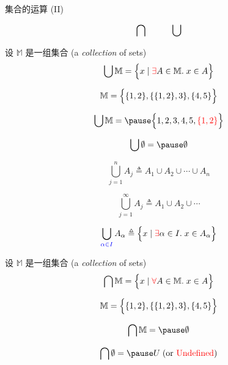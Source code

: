 
\begin{frame}{}
  \begin{center}
    {\Large 集合的运算 (II)}
  \end{center}

  \[
    \text{\Large $\bigcap \qquad \bigcup$}
  \]
\end{frame}

\begin{frame}{}
  \begin{definition}
    设 $\mathbb{M}$ 是一组集合 (a {\it collection} of sets)
    \[
      \bigcup \mathbb{M} = \Big\{x \mid \textcolor{red}{\exists} A \in \mathbb{M}.\; x \in A\Big\}
    \]
  \end{definition}

  \pause
  \[
    \mathbb{M} = \Big\{\{1, 2\}, \{\{1, 2\}, 3\}, \{4, 5\}\Big\}
  \]

  \pause
  \[
    \bigcup \mathbb{M} = \pause\Bset{1, 2, 3, 4, 5, \red{\set{1, 2}}}
  \]

  \pause
  \[
    \bigcup \emptyset = \pause \emptyset
  \]
\end{frame}

\begin{frame}{}
  \[
    \bigcup_{j = 1}^{n} A_j \triangleq A_1 \cup A_2 \cup \cdots \cup A_n
  \]

  \pause
  \vspace{0.50cm}
  \[
    \bigcup_{j = 1}^{\infty} A_j \triangleq A_1 \cup A_2 \cup \cdots
  \]

  \pause
  \vspace{0.50cm}
  \[
    \bigcup_{\textcolor{blue}{\alpha \in I}} A_{\alpha} \triangleq
      \Big\{x \mid \textcolor{red}{\exists} \alpha \in I.\; x \in A_{\alpha}\Big\}
  \]
\end{frame}

\begin{frame}{}
  \begin{definition}
    设 $\mathbb{M}$ 是一组集合 (a {\it collection} of sets)
    \[
      \bigcap \mathbb{M} = \Big\{x \mid \textcolor{red}{\forall} A \in \mathbb{M}.\; x \in A\Big\}
    \]
  \end{definition}

  \pause
  \[
    \mathbb{M} = \Big\{\{1, 2\}, \{\{1, 2\}, 3\}, \{4, 5\}\Big\}
  \]

  \pause
  \[
    \bigcap \mathbb{M} = \pause\emptyset
  \]

  \pause
  \[
    \bigcap \emptyset = \pause U \;(\text{or \red{Undefined}})
  \]
\end{frame}

